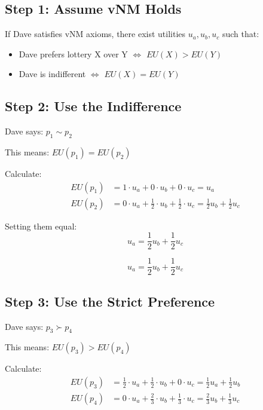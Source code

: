 \documentclass[11pt]{article}
\begin{document}
\subsection{Step 1: Assume vNM Holds}

If Dave satisfies vNM axioms, there exist utilities $u_a, u_b, u_c$ such that:
\begin{itemize}
\item Dave prefers lottery X over Y $\iff$ $EU(X) > EU(Y)$
\item Dave is indifferent $\iff$ $EU(X) = EU(Y)$
\end{itemize}

\subsection{Step 2: Use the Indifference}

Dave says: $p_1 \sim p_2$

This means: $EU(p_1) = EU(p_2)$

Calculate:
\begin{align}
EU(p_1) &= 1 \cdot u_a + 0 \cdot u_b + 0 \cdot u_c = u_a \\
EU(p_2) &= 0 \cdot u_a + \frac{1}{2} \cdot u_b + \frac{1}{2} \cdot u_c = \frac{1}{2}u_b + \frac{1}{2}u_c
\end{align}

Setting them equal:
\begin{equation}
u_a = \frac{1}{2}u_b + \frac{1}{2}u_c
\end{equation}

\begin{tcolorbox}[colback=green!5!white,colframe=green!75!black,title=Key Equation 1]
$$u_a = \frac{1}{2}u_b + \frac{1}{2}u_c$$
\end{tcolorbox}

\subsection{Step 3: Use the Strict Preference}

Dave says: $p_3 \succ p_4$

This means: $EU(p_3) > EU(p_4)$

Calculate:
\begin{align}
EU(p_3) &= \frac{1}{2} \cdot u_a + \frac{1}{2} \cdot u_b + 0 \cdot u_c = \frac{1}{2}u_a + \frac{1}{2}u_b \\
EU(p_4) &= 0 \cdot u_a + \frac{2}{3} \cdot u_b + \frac{1}{3} \cdot u_c = \frac{2}{3}u_b + \frac{1}{3}u_c
\end{align}
\end{document}
